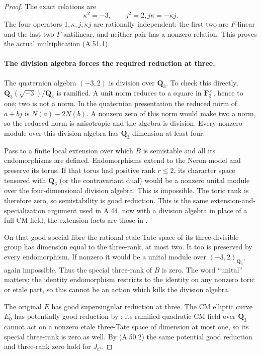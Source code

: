\begin{proof}
The exact relations are
\[
             \kappa^2=-3,\qquad j^2=2,
                         j\kappa=-\kappa j.
                                                               \tag{A.51.13}
\]
The four operators \(1,\kappa,j,\kappa j\)
are rationally independent: the first two are
\(F\)-linear and the last two \(F\)-antilinear,
and neither pair has a nonzero relation.
This proves the actual multiplication (A.51.1).

\paragraph{The division algebra forces the required reduction at three.}
The quaternion algebra \((-3,2)\) is division
over \(\mathbf Q_3\). To check this directly,
\(\mathbf Q_3(\sqrt{-3})/\mathbf Q_3\) is
ramified. A unit norm reduces to a square in
\(\mathbf F_3^\times\), hence to one; two is
not a norm. In the quaternion presentation the
reduced norm of \(a+bj\) is
\(N(a)-2N(b)\). A nonzero zero of this norm
would make two a norm, so the reduced norm is
anisotropic and the algebra is division.
Every nonzero module over this division algebra
has \(\mathbf Q_3\)-dimension at least four.

Pass to a finite local extension over which
\(B\) is semistable and all its endomorphisms
are defined. Endomorphisms extend to the Neron
model and preserve its torus. If that torus
had positive rank \(r\le2\), its character
space tensored with \(\mathbf Q_3\) (or the
contravariant dual) would be a nonzero unital module over the
four-dimensional division algebra. This is
impossible. The toric rank is therefore zero,
so semistability is good reduction. This is
the same extension-and-specialization argument
used in A.44, now with a division algebra in
place of a full CM field; the extension facts
are those in \cite[proof of Theorem 6(a), p.~503]{fghSerreTate1968}.

On that good special fibre the rational etale
Tate space of its three-divisible group has
dimension equal to the three-rank, at most two.
It too is preserved by every endomorphism.
If nonzero it would be a unital module over
\((-3,2)_{\mathbf Q_3}\), again impossible.
Thus the special three-rank of \(B\) is zero.
The word ``unital'' matters: the identity
endomorphism restricts to the identity on any
nonzero toric or etale part, so this cannot be
an action which kills the division algebra.

The original \(E\) has good supersingular
reduction at three. The CM elliptic curve
\(E_0\) has potentially good reduction by
\cite[Theorem 6(a)]{fghSerreTate1968}; its ramified
quadratic CM field over \(\mathbf Q_3\)
cannot act on a nonzero etale three-Tate space
of dimension at most one, so its special
three-rank is zero as well. By (A.50.2) the
same potential good reduction and three-rank
zero hold for \(J_C\).


\end{proof}

